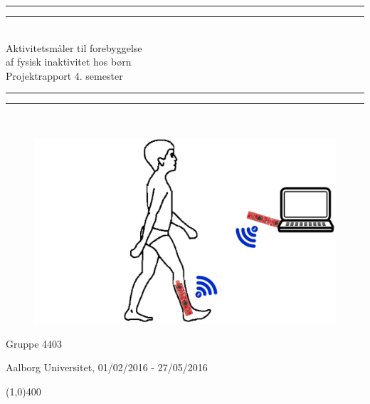 \begin{center}
	\vspace*{\baselineskip}
	\rule{\textwidth}{1.6pt}\vspace*{-\baselineskip}\vspace*{2pt} %
	\rule{\textwidth}{0.4pt}\\[\baselineskip] %
	
	{\huge Aktivitetsmåler til forebyggelse\\\hspace*{2ex} af fysisk inaktivitet hos børn \\[0.5\baselineskip] \large Projektrapport 4. semester}\\[0.2\baselineskip] %
	
	\rule{\textwidth}{0.4pt}\vspace*{-\baselineskip}\vspace{3.2pt} %
	\rule{\textwidth}{1.6pt}\\[\baselineskip] %
	\vspace*{5\baselineskip}
	\begin{figure}[H]
		\centering
		\begin{minipage}[c]{1\textwidth}
			\includegraphics[width=.75\textwidth]{figures/forside2.PNG}
		\end{minipage}
		\hfill
	\end{figure}
	\vspace*{\fill}
	\scshape %
	{\Large Gruppe 4403\par}
	
	\vspace*{.8\baselineskip} %
	
	Aalborg Universitet,  01/02/2016 - 27/05/2016 \par %
\end{center} %

\begin{center}
	\line(1,0){400}
\end{center}